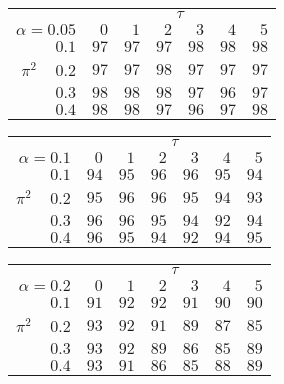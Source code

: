 \begin{tabular}{r|rrrrrr}
\hline\hline
 &\multicolumn{6}{c}{$\tau$} \\ 
 $\alpha = 0.05$ & $0$ & $1$ & $2$ & $3$ & $4$ & $5$ \\ 
 \hline$0.1$ & $97$ & $97$ & $97$ & $98$ & $98$ & $98$\\ 
$\pi^2\;\;\;$ $0.2$ & $97$ & $97$ & $98$ & $97$ & $97$ & $97$\\ 
$0.3$ & $98$ & $98$ & $98$ & $97$ & $96$ & $97$\\ 
$0.4$ & $98$ & $98$ & $97$ & $96$ & $97$ & $98$\\ 
 \hline 
 \end{tabular}
 
 \vspace{2em} 
 
\begin{tabular}{r|rrrrrr}
\hline\hline
 &\multicolumn{6}{c}{$\tau$} \\ 
 $\alpha = 0.1$ & $0$ & $1$ & $2$ & $3$ & $4$ & $5$ \\ 
 \hline$0.1$ & $94$ & $95$ & $96$ & $96$ & $95$ & $94$\\ 
$\pi^2\;\;\;$ $0.2$ & $95$ & $96$ & $96$ & $95$ & $94$ & $93$\\ 
$0.3$ & $96$ & $96$ & $95$ & $94$ & $92$ & $94$\\ 
$0.4$ & $96$ & $95$ & $94$ & $92$ & $94$ & $95$\\ 
 \hline 
 \end{tabular}
 
 \vspace{2em} 
 
\begin{tabular}{r|rrrrrr}
\hline\hline
 &\multicolumn{6}{c}{$\tau$} \\ 
 $\alpha = 0.2$ & $0$ & $1$ & $2$ & $3$ & $4$ & $5$ \\ 
 \hline$0.1$ & $91$ & $92$ & $92$ & $91$ & $90$ & $90$\\ 
$\pi^2\;\;\;$ $0.2$ & $93$ & $92$ & $91$ & $89$ & $87$ & $85$\\ 
$0.3$ & $93$ & $92$ & $89$ & $86$ & $85$ & $89$\\ 
$0.4$ & $93$ & $91$ & $86$ & $85$ & $88$ & $89$\\ 
 \hline 
 \end{tabular}